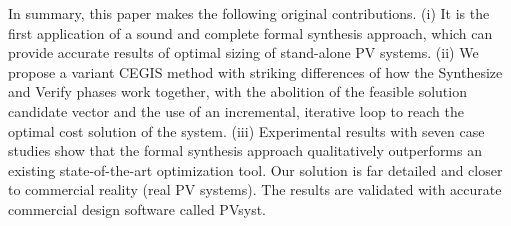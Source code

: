 \documentclass[journal]{IEEEtran}
\begin{document}
In summary, this paper makes the following original contributions. (i) It is the first application of a sound and complete formal synthesis approach, which can provide accurate results of optimal sizing of stand-alone PV systems. (ii) We propose a variant CEGIS method with striking differences of how the {\sc Synthesize} and {\sc Verify} phases work together, with the abolition of the feasible solution candidate vector and the use of an incremental, iterative loop to reach the optimal cost solution of the system. (iii) Experimental results with seven case studies show that the formal synthesis approach qualitatively outperforms an existing state-of-the-art optimization tool. Our solution is far detailed and closer to commercial reality (real PV systems). The results are validated with accurate commercial design software called PVsyst. 
\end{document}
